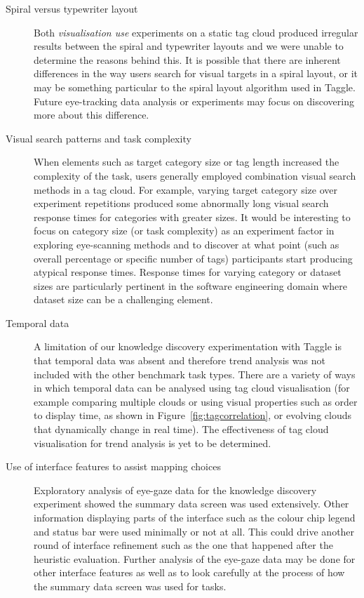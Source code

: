 \begin{description}
	\item [Spiral versus typewriter layout] Both \emph{visualisation use} experiments on a static tag cloud produced irregular results between the spiral and typewriter layouts and we were unable to determine the reasons behind this. It is possible that there are inherent differences in the way users search for visual targets in a spiral layout, or it may be something particular to the spiral layout algorithm used in Taggle. Future eye-tracking data analysis or experiments may focus on discovering more about this difference.

	\item [Visual search patterns and task complexity] When elements such as target category size or tag length increased the complexity of the task, users generally employed combination visual search methods in a tag cloud. For example, varying target category size over experiment repetitions produced some abnormally long visual search response times for categories with greater sizes. It would be interesting to focus on category size (or task complexity) as an experiment factor in exploring eye-scanning methods and to discover at what point (such as overall percentage or specific number of tags) participants start producing atypical response times. Response times for varying category or dataset sizes are particularly pertinent in the software engineering domain where dataset size can be a challenging element.

	\item [Temporal data] A limitation of our knowledge discovery experimentation with Taggle is that temporal data was absent and therefore trend analysis was not included with the other benchmark task types. There are a variety of ways in which temporal data can be analysed using tag cloud visualisation (for example comparing multiple clouds or using visual properties such as order to display time, as shown in Figure~\vref{fig:tagcorrelation}, or evolving clouds that dynamically change in real time). The effectiveness of tag cloud visualisation for trend analysis is yet to be determined.

	\item [Use of interface features to assist mapping choices] Exploratory analysis of eye-gaze data for the knowledge discovery experiment showed the summary data screen was used extensively. Other information displaying parts of the interface such as the colour chip legend and status bar were used minimally or not at all. This could drive another round of interface refinement such as the one that happened after the heuristic evaluation. Further analysis of the eye-gaze data may be done for other interface features as well as to look carefully at the process of how the summary data screen was used for tasks. 


\end{description}
